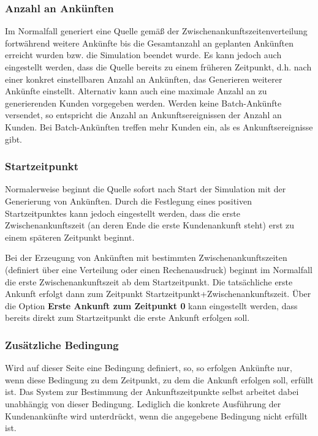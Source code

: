 \subsubsection*{Anzahl an Ankünften}

Im Normalfall generiert eine Quelle gemäß der Zwischenankunftszeitenverteilung fortwährend
weitere Ankünfte bis die Gesamtanzahl an geplanten Ankünften erreicht wurden bzw. die Simulation beendet wurde.
Es kann jedoch auch eingestellt werden, dass die Quelle bereits zu einem früheren Zeitpunkt,
d.h. nach einer konkret einstellbaren Anzahl an Ankünften, das Generieren weiterer Ankünfte einstellt.
Alternativ kann auch eine maximale Anzahl an zu generierenden Kunden vorgegeben werden.
Werden keine Batch-Ankünfte versendet, so entspricht die Anzahl an Ankunftsereignissen der
Anzahl an Kunden. Bei Batch-Ankünften treffen mehr Kunden ein, als es Ankunftsereignisse gibt.

\subsubsection*{Startzeitpunkt}

Normalerweise beginnt die Quelle sofort nach Start der Simulation mit der Generierung von
Ankünften. Durch die Festlegung eines positiven Startzeitpunktes kann jedoch eingestellt
werden, dass die erste Zwischenankunftszeit (an deren Ende die erste Kundenankunft steht) erst
zu einem späteren Zeitpunkt beginnt.

Bei der Erzeugung von Ankünften mit bestimmten Zwischenankunftszeiten (definiert über eine Verteilung
oder einen Rechenausdruck) beginnt im Normalfall die erste Zwischenankunftszeit ab dem Startzeitpunkt.
Die tatsächliche erste Ankunft erfolgt dann zum Zeitpunkt Startzeitpunkt+Zwischenankunftszeit. Über
die Option \textbf{Erste Ankunft zum Zeitpunkt 0} kann eingestellt werden, dass bereits direkt zum
Startzeitpunkt die erste Ankunft erfolgen soll.

\subsubsection*{Zusätzliche Bedingung}

Wird auf dieser Seite eine Bedingung definiert, so, so erfolgen Ankünfte nur, wenn diese Bedingung
zu dem Zeitpunkt, zu dem die Ankunft erfolgen soll, erfüllt ist.
Das System zur Bestimmung der Ankunftszeitpunkte selbst arbeitet dabei unabhängig von dieser Bedingung.
Lediglich die konkrete Ausführung der Kundenankünfte wird unterdrückt, wenn die angegebene Bedingung nicht erfüllt ist.

